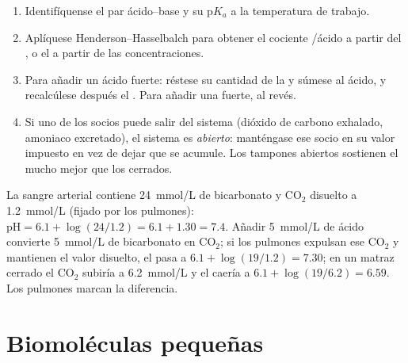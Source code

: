 \begin{method}\label{met:b1:water-small-molecules:bufferarith}
\begin{enumerate}
  \item Identifíquense el par ácido--base y su p$K_a$ a la temperatura de
        trabajo.
  \item Aplíquese Henderson--Hasselbalch para obtener el cociente
        /ácido a partir del , o el  a partir de las
        concentraciones.
  \item Para añadir un ácido fuerte: réstese su cantidad de la  y
        súmese al ácido, y recalcúlese después el . Para añadir una 
        fuerte, al revés.
  \item Si uno de los socios puede salir del sistema (dióxido de carbono
        exhalado, amoniaco excretado), el sistema es \emph{abierto}:
        manténgase ese socio en su valor impuesto en vez de dejar que se
        acumule. Los tampones abiertos sostienen el  mucho mejor que los
        cerrados.
\end{enumerate}
\end{method}

\begin{example}[La sangre]\label{ex:b1:water-small-molecules:blood}
La sangre arterial contiene \qty{24}{mmol/L} de bicarbonato y
$\mathrm{CO_2}$ disuelto a \qty{1.2}{mmol/L} (fijado por los pulmones):
$\mathrm{pH} =
6.1 + \log(24/1.2) = 6.1 + 1.30 = 7.4$. Añadir
\qty{5}{mmol/L} de ácido convierte \qty{5}{mmol/L} de bicarbonato en
$\mathrm{CO_2}$; si los pulmones expulsan ese $\mathrm{CO_2}$ y mantienen el
valor disuelto, el  pasa a $6.1 + \log(19/1.2) = 7.30$; en un matraz
cerrado el $\mathrm{CO_2}$ subiría a \qty{6.2}{mmol/L} y el  caería a
$6.1 + \log(19/6.2) =
6.59$. Los pulmones marcan la diferencia.
\end{example}

\section{Biomoléculas pequeñas}

